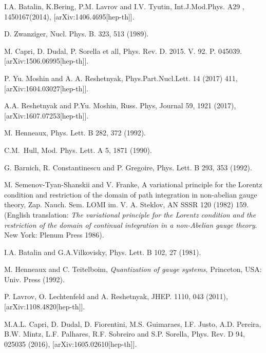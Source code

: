 \documentclass[10pt]{article}
\begin{document}
\begin{thebibliography}{99}
I.A. Batalin, K.Bering,  P.M. Lavrov and I.V. Tyutin, Int.J.Mod.Phys. A29 ,  1450167(2014), [arXiv:1406.4695[hep-th]].

 D. Zwanziger, Nucl. Phys. B. 323, 513 (1989).

 M. Capri,  D. Dudal, P. Sorella et all,  Phys. Rev. D. 2015.  V. 92. P. 045039.
[arXiv:1506.06995[hep-th]].

 P. Yu. Moshin and A. A. Reshetnyak, Phys.Part.Nucl.Lett. 14 (2017) 411, [arXiv:1604.03027[hep-th]].

 A.A. Reshetnyak and P.Yu. Moshin,
Russ. Phys, Journal 59,   1921 (2017),
 [arXiv:1607.07253[hep-th]].

M. Henneaux,
Phys. Lett. B 282, 372 (1992).

C.M.~Hull,
 Mod. Phys. Lett. A {5}, 1871 (1990).

G. Barnich, R. Constantinescu and P. Gregoire,
Phys. Lett. B 293, 353  (1992).

M. Semenov-Tyan-Shanskii  and    V. Franke,
A variational
principle for the Lorentz condition and restriction of the
domain of path integration in non-abelian gauge theory,
Zap. Nauch. Sem. LOMI im. V. A. Steklov, AN SSSR 120 (1982) 159. (English
translation: \emph{The variational principle for the Lorentz condition and the restriction of the domain of continual integration in a non-Abelian gauge theory}. New York: Plenum Press 1986).


 I.A. Batalin and G.A.Vilkovisky, Phys. Lett. B 102, 27 (1981).

 M. Henneaux and C. Teitelboim, \textit{Quantization of gauge
systems}, Princeton, USA: Univ. Press (1992).

 P. Lavrov, O. Lechtenfeld and A. Reshetnyak, JHEP. 1110, 043
(2011), [arXiv:1108.4820[hep-th]].

M.A.L. Capri, D. Dudal, D. Fiorentini, M.S. Guimaraes, I.F. Justo, A.D. Pereira, B.W. Mintz, L.F. Palhares,
R.F. Sobreiro and S.P. Sorella,  Phys. Rev. D
94,  025035 (2016), [arXiv:1605.02610[hep-th]].


\end{thebibliography}
\end{document}
